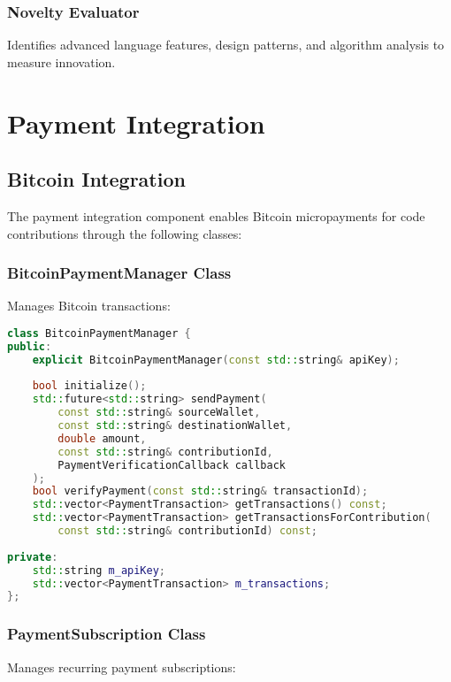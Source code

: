 \documentclass[11pt,a4paper]{report}
\begin{document}
\subsection{Novelty Evaluator}
Identifies advanced language features, design patterns, and algorithm analysis to measure innovation.

\chapter{Payment Integration}

\section{Bitcoin Integration}

The payment integration component enables Bitcoin micropayments for code contributions through the following classes:

\subsection{BitcoinPaymentManager Class}
Manages Bitcoin transactions:

\begin{lstlisting}[language=C++]
class BitcoinPaymentManager {
public:
    explicit BitcoinPaymentManager(const std::string& apiKey);
    
    bool initialize();
    std::future<std::string> sendPayment(
        const std::string& sourceWallet,
        const std::string& destinationWallet,
        double amount,
        const std::string& contributionId,
        PaymentVerificationCallback callback
    );
    bool verifyPayment(const std::string& transactionId);
    std::vector<PaymentTransaction> getTransactions() const;
    std::vector<PaymentTransaction> getTransactionsForContribution(
        const std::string& contributionId) const;
    
private:
    std::string m_apiKey;
    std::vector<PaymentTransaction> m_transactions;
};
\end{lstlisting}

\subsection{PaymentSubscription Class}
Manages recurring payment subscriptions:
\end{document}
